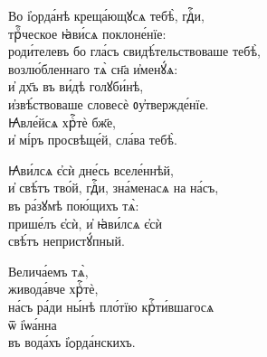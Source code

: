\documentclass{article}
\begin{document}
%
Во і҆ѻрда́нѣ креща́ющꙋсѧ тебѣ̀, гдⷭ҇и,\\
трⷪ҇ческое ꙗ҆ви́сѧ поклоне́нїе:\\
роди́телевъ бо гла́съ свидѣ́тельствоваше тебѣ̀,\\
возлю́бленнаго тѧ̀ сн҃а и҆менꙋ́ѧ:\\
и҆ дх҃ъ въ ви́дѣ голꙋби́нѣ,\\
и҆звѣ́ствоваше словесѐ ᲂу҆твержде́нїе.\\
Ꙗ҆вле́йсѧ хрⷭ҇тѐ бж҃е,\\
и҆ мі́ръ просвѣще́й, сла́ва тебѣ̀.

Ꙗ҆ви́лсѧ є҆сѝ дне́сь вселе́ннѣй,\\
и҆ свѣ́тъ тво́й, гдⷭ҇и, зна́менасѧ на на́съ,\\
въ ра́зꙋмѣ пою́щихъ тѧ̀:\\
прише́лъ є҆сѝ, и҆ ꙗ҆ви́лсѧ є҆сѝ\\
свѣ́тъ непристꙋ́пный.

Велича́емъ тѧ̀,\\
живода́вче хрⷭ҇тѐ,\\
на́съ ра́ди ны́нѣ пло́тїю крⷭ҇ти́вшагосѧ\\
ѿ і҆ѡа́нна\\
въ вода́хъ і҆ѻрда́нскихъ.
\end{document}
